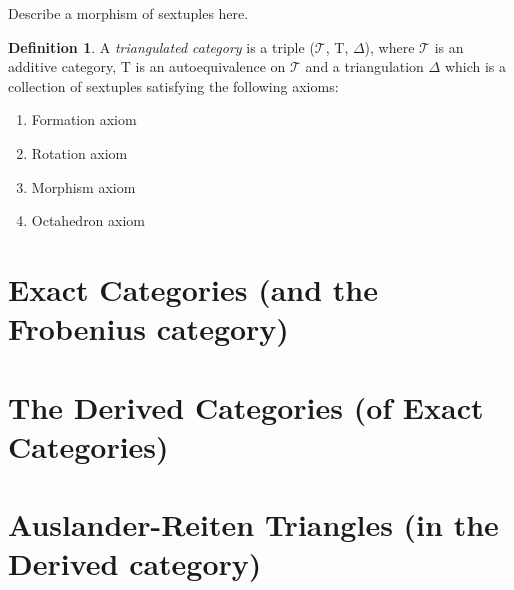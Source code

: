 \documentclass[12pt]{article}
\theoremstyle{definition}
\newtheorem{definition}{Definition}[section]
\theoremstyle{remark}
\begin{document}
        Describe a morphism of sextuples here.

        \begin{definition}
            A \emph{triangulated category} is a triple ($\mathcal{T}$, T, $\Delta$), where $\mathcal{T}$ is an additive category, T is an autoequivalence on $\mathcal{T}$ and a triangulation $\Delta$ which is a collection of sextuples satisfying the following axioms:

            \begin{enumerate}
                \item Formation axiom
                
                \item Rotation axiom
                \item Morphism axiom
                \item Octahedron axiom
            \end{enumerate}
        \end{definition}
    \section{Exact Categories (and the Frobenius category)}
    \section{The Derived Categories (of Exact Categories)}
    \section{Auslander-Reiten Triangles (in the Derived category)}
\end{document}
